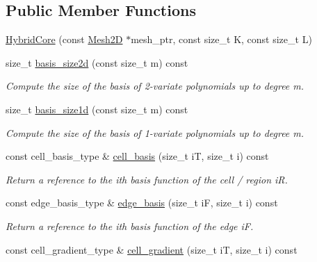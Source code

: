 \subsection*{Public Member Functions}
\begin{DoxyCompactItemize}
\item 
\hyperlink{classMeshFramework2D_1_1HybridCore_ab4fc16145e01888229f1ce27e31ccea9}{Hybrid\+Core} (const \hyperlink{classMeshFramework2D_1_1Mesh2D}{Mesh2D} $\ast$mesh\+\_\+ptr, const size\+\_\+t K, const size\+\_\+t L)
\item 
size\+\_\+t \hyperlink{classMeshFramework2D_1_1HybridCore_a09aabd37f36e11bbcfffbb5bb59e54d2}{basis\+\_\+size2d} (const size\+\_\+t m) const
\begin{DoxyCompactList}\small\item\em Compute the size of the basis of 2-\/variate polynomials up to degree m. \end{DoxyCompactList}\item 
size\+\_\+t \hyperlink{classMeshFramework2D_1_1HybridCore_a08aad1cf56ccfe043d98d3e665f68de3}{basis\+\_\+size1d} (const size\+\_\+t m) const
\begin{DoxyCompactList}\small\item\em Compute the size of the basis of 1-\/variate polynomials up to degree m. \end{DoxyCompactList}\item 
const cell\+\_\+basis\+\_\+type \& \hyperlink{classMeshFramework2D_1_1HybridCore_a34242db07cc2b3c3b867d9e4580b634d}{cell\+\_\+basis} (size\+\_\+t iT, size\+\_\+t i) const
\begin{DoxyCompactList}\small\item\em Return a reference to the i\textquotesingle{}th basis function of the cell / region iR. \end{DoxyCompactList}\item 
const edge\+\_\+basis\+\_\+type \& \hyperlink{classMeshFramework2D_1_1HybridCore_ad6facc0f763dc9662918a072c2b2cf2d}{edge\+\_\+basis} (size\+\_\+t iF, size\+\_\+t i) const
\begin{DoxyCompactList}\small\item\em Return a reference to the i\textquotesingle{}th basis function of the edge iF. \end{DoxyCompactList}\item 
const cell\+\_\+gradient\+\_\+type \& \hyperlink{classMeshFramework2D_1_1HybridCore_a710fc23b914623b90a2699ab4291e539}{cell\+\_\+gradient} (size\+\_\+t iT, size\+\_\+t i) const
\item 

\end{DoxyCompactItemize}
